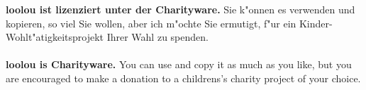 \label{section:licence}
\textbf{loolou ist lizenziert unter der Charityware.} Sie k"onnen es verwenden und kopieren, so viel Sie wollen, aber ich m"ochte Sie ermutigt, f"ur ein Kinder-Wohlt"atigkeitsprojekt Ihrer Wahl zu spenden. \\
\\
\textbf{loolou is Charityware.} You can use and copy it as much as you like, but you are encouraged to make a donation to a childrens's charity project of your choice.

